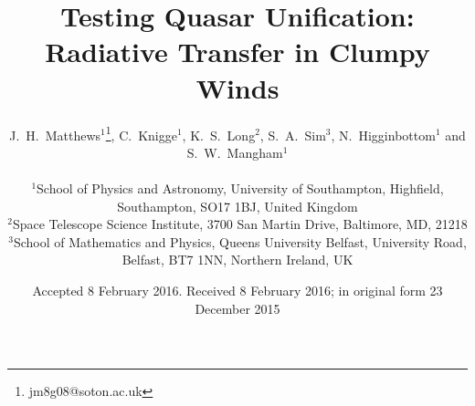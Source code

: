 \documentclass[useAMS,usenatbib]{mn2e_x}
\begin{document}


\def\py{\textsc{Python}}
\def\tar{\textsc{Tardis}}
\def\cld{\textsc{Cloudy}}
\def\agn{\textsc{Agnspec}}


\def\civ{C~\textsc{iv}}
\def\nv{N~\textsc{v}}
\def\hei{He~\textsc{i}}
\def\heii{He~\textsc{ii}}
\def\heiiline{He~\textsc{ii}~$4686$\AA}
\def\mg{Mg~\textsc{ii}}
\def\al{Al~\textsc{iii}}
\def\heii{He~\textsc{ii}}
\def\ovi{O~\textsc{vi}}
\def\la{Ly~$\alpha$}
\def\ha{H$\alpha$}
\def\hb{H$\beta$}
\def\civline{C~\textsc{iv}~$1550$\AA}
\def\nvline{N~\textsc{v}~$1240$\AA}
\def\mgline{Mg~\textsc{ii}~$2800$\AA}


\def\araa{ARAA}
\def\nat{Nature}
\def\apjl{ApJ Letters}
\def\aapr{AAPR}
\def\ssr{SSR}
\def\apj{ApJ}
\def\apjs{ApJs}
\def\pasp{PASP}
\def\aap{A\&A}
\def\mnras{MNRAS}
\def\aj{AJ}
\def\rmxaa{RMXAA}
\def\aaps{A\&As}
\def\LA{Lyman\thinspace$\alpha$}

\newcommand{\EXPN}[2]{\mbox{$#1\times 10^{#2}$}}
\newcommand{\EXPU}[3]{\mbox{\rm $#1 \times 10^{#2} \rm\:#3$}}  %
\newcommand{\POW}[2]{\mbox{$\rm10^{#1}\rm\:#2$}}
\def\LUM{\:{\rm erg\:s^{-1}}}
\def\FLUX{\:{\rm erg\:cm^{-2}\:s^{-1}}}
\def\OIGS{\:{\rm erg\:cm^{-2}\:s^{-1}\:\AA^{-1}}}

%
%

\title
[Radiative Transfer in Clumpy Winds]
{
Testing Quasar Unification: Radiative Transfer in Clumpy Winds
}


\author[Matthews et al.]{
\parbox[t]{\textwidth}{
J.~H.~Matthews$^1$\thanks{jm8g08@soton.ac.uk}, C.~Knigge$^1$, 
K.~S.~Long$^2$, S.~A.~Sim$^3$, N.~Higginbottom$^1$ and S.~W.~Mangham$^1$
}
\medskip  
\\$^1$School of Physics and Astronomy, University of Southampton, Highfield, Southampton, SO17 1BJ, United Kingdom
\\$^2$Space Telescope Science Institute, 3700 San Martin Drive, Baltimore, MD, 21218
\\$^3$School of Mathematics and Physics, Queens University Belfast, University Road, Belfast, BT7 1NN, Northern Ireland, UK
}


\date{Accepted 8 February 2016. Received 8 February 2016; in original form 23 December 2015}
%
%
\end{document}
